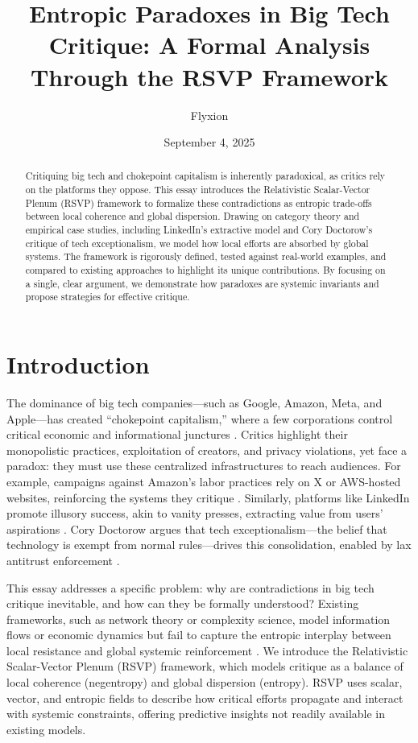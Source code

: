 \documentclass{article}
\title{Entropic Paradoxes in Big Tech Critique: A Formal Analysis Through the RSVP Framework}
\author{Flyxion}
\date{September 4, 2025}
\begin{document}
\maketitle

\begin{abstract}
Critiquing big tech and chokepoint capitalism is inherently paradoxical, as critics rely on the platforms they oppose. This essay introduces the Relativistic Scalar-Vector Plenum (RSVP) framework to formalize these contradictions as entropic trade-offs between local coherence and global dispersion. Drawing on category theory and empirical case studies, including LinkedIn’s extractive model and Cory Doctorow’s critique of tech exceptionalism, we model how local efforts are absorbed by global systems. The framework is rigorously defined, tested against real-world examples, and compared to existing approaches to highlight its unique contributions. By focusing on a single, clear argument, we demonstrate how paradoxes are systemic invariants and propose strategies for effective critique.
\end{abstract}

\section{Introduction}

The dominance of big tech companies—such as Google, Amazon, Meta, and Apple—has created ``chokepoint capitalism,'' where a few corporations control critical economic and informational junctures \cite{giblin2022chokepoint}. Critics highlight their monopolistic practices, exploitation of creators, and privacy violations, yet face a paradox: they must use these centralized infrastructures to reach audiences. For example, campaigns against Amazon's labor practices rely on X or AWS-hosted websites, reinforcing the systems they critique \cite{doctorow2023internetcon}. Similarly, platforms like LinkedIn promote illusory success, akin to vanity presses, extracting value from users’ aspirations \cite{theculturejournalist2023,amos2024}. Cory Doctorow argues that tech exceptionalism—the belief that technology is exempt from normal rules—drives this consolidation, enabled by lax antitrust enforcement \cite{doctorow2023internetcon}.

This essay addresses a specific problem: why are contradictions in big tech critique inevitable, and how can they be formally understood? Existing frameworks, such as network theory or complexity science, model information flows or economic dynamics but fail to capture the entropic interplay between local resistance and global systemic reinforcement \cite{barabasi2002linked}. We introduce the Relativistic Scalar-Vector Plenum (RSVP) framework, which models critique as a balance of local coherence (negentropy) and global dispersion (entropy). RSVP uses scalar, vector, and entropic fields to describe how critical efforts propagate and interact with systemic constraints, offering predictive insights not readily available in existing models.
\end{document}
